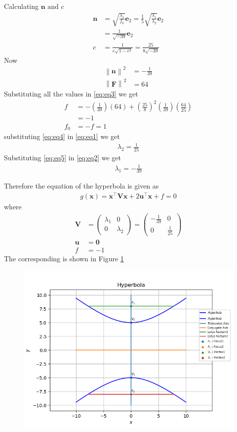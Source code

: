 \documentclass[12pt]{article}
\providecommand{\brak}[1]{\ensuremath{\left(#1\right)}}
\providecommand{\norm}[1]{\left\lVert#1\right\rVert}
\newcommand{\myvec}[1]{\ensuremath{\begin{pmatrix}#1\end{pmatrix}}}
\let\vec\mathbf
\begin{document}
\begin{enumerate}
Calculating $\vec{n} \text{ and } c$
\begin{align}
	\vec{n} &= \sqrt{\frac{\lambda_1}{f_0}}\vec{e}_2 = \frac{1}{5}\sqrt{\frac{\lambda_1}{\lambda_2}}\vec{e}_2\\
	        &= \frac{1}{\sqrt{-39}}\vec{e}_2\\
	c &= \frac{1}{e\sqrt{1-e^2}} = \frac{25}{8\sqrt{-39}}	
\end{align}
Now
\begin{align}
	\norm{\vec{n}}^2 &= -\frac{1}{39}\\
	\norm{\vec{F}}^2 &= 64
\end{align}
Substituting all the values in \eqref{eq:eq3} we get
\begin{align}
	f &= -\brak{\frac{1}{39}}\brak{64} + \brak{\frac{25}{8}}^2 \brak{\frac{1}{39}} \brak{\frac{64}{25}}\\
	  &= -1\\
	\label{eq:eq4}  
	f_0  &= -f = 1
\end{align}
substituting \eqref{eq:eq4} in \eqref{eq:eq1} we get
\begin{align}
	\label{eq:eq5}
	\lambda_2 = \frac{1}{25} 
\end{align}
Substituting \eqref{eq:eq5} in \eqref{eq:eq2} we get
\begin{align}
	\lambda_1 = -\frac{1}{39}
\end{align}
\end{enumerate}
Therefore the equation of the hyperbola is given as
\begin{align}
	g\brak{\vec{x}}=\vec{x}^\top \vec{V} \vec{x} + 2\vec{u}^\top \vec{x} + f = 0
\end{align}
where
\begin{align}
	\vec{V} &= \myvec{\lambda_1&0\\0&\lambda_2} = \myvec{-\frac{1}{39}&0\\0&\frac{1}{25}}\\
	\vec{u} &= \vec{0}\\
	f &= -1
\end{align}
The corresponding is shown in Figure \ref{fig:Fig1}
\begin{figure}[!h]
	\begin{center} 
	    \includegraphics[width=\columnwidth]{figs/hyperbola2}
	\end{center}
\caption{}
\label{fig:Fig1}
\end{figure}
\end{document}
